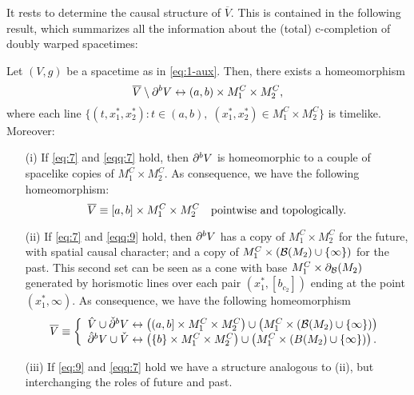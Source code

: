 \smallskip

It rests to determine the causal structure of $\overline{V}$. This is contained in the following result, which summarizes all the information about the (total) c-completion of doubly warped spacetimes:
  \begin{thm}\label{thm:main}
    Let $(V,g)$ be a {\multiwarped} spacetime as in \eqref{eq:1-aux}. Then, there exists a homeomorphism
    \[
\overline{V}\setminus \partial^{b}V \leftrightarrow (a,b) \times M_1^C\times M_2^C,
      \]
    where each line $\{(t,x_1^*,x_2^*): t\in (a,b),\; (x_1^*,x_2^*)\in M_1^C\times M_2^C\}$ is timelike. Moreover:
     \begin{itemize}
      \item[(i)] If \eqref{eq:7} and \eqref{eqq:7} hold, then $\partial^{b} V$ is homeomorphic to a couple of spacelike copies of $M_1^C\times M_2^C$. As consequence, we have the following homeomorphism:
        \begin{equation}
          \label{eq:18}
         \overline{V}\equiv [a,b]\times M_1^C\times M_2^C\quad\hbox{pointwise and topologically.}
        \end{equation}

        \item[(ii)] If \eqref{eq:7} and \eqref{eqq:9} hold, then $\partial^{b} V$ has a copy of $M_1^C\times M_2^C$ for the future, with spatial causal character; and a copy of $M_1^C\times \left({\cal B}(M_2)\cup \{\infty\}\right)$ for the past.  This second set can be seen as a cone with base $M_1^C\times \partial_{\cal B}(M_2)$ generated by horismotic lines over each pair $(x_1^*,[b_{c_2}])$ ending at the point $(x_1^*,\infty)$. As consequence, we have the following homeomorphism
          \[
              \overline{V}\equiv\left\{\begin{array}{l} \hat{V}\cup \check{\partial}^{b}V \leftrightarrow \left((a,b]\times M_1^C\times M_2^C\right) \cup \left(M_1^C\times \left({\cal B}(M_2)\cup \{\infty\}\right)\right) \\ \hat{\partial}^{b} V\cup \check{V} \leftrightarrow \left(\{b\}\times M_1^C\times M_2^C\right) \cup \left(M_1^C\times \left(B(M_2)\cup \{\infty\} \right) \right).
            \end{array}\right.
            \]


          \item[(iii)] If \eqref{eq:9} and \eqref{eqq:7} hold we have a structure analogous to (ii), but interchanging the roles of future and past.


\end{itemize}
\end{thm}
